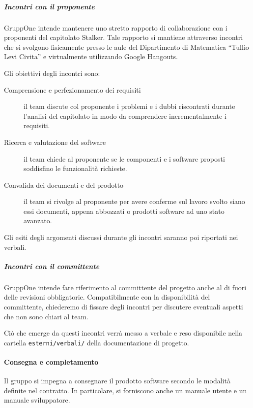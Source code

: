 \documentclass[../../norme-di-progetto.tex]{subfiles}
\begin{document}
\subparagraph{Incontri con il proponente}%
\label{subp:incontri_con_il_proponente}

GruppOne intende mantenere uno stretto rapporto di collaborazione con i proponenti del capitolato Stalker.
Tale rapporto si mantiene attraverso incontri che si svolgono fisicamente presso le aule del Dipartimento di Matematica ``Tullio Levi Civita'' e virtualmente utilizzando Google Hangouts.

Gli obiettivi degli incontri sono:
\begin{description}
  \item [Comprensione e perfezionamento dei requisiti] il team discute col proponente i problemi e i dubbi riscontrati durante l'analisi del capitolato in modo da comprendere incrementalmente i requisiti.
  \item [Ricerca e valutazione del software] il team chiede al proponente se le componenti e i software proposti soddisfino le funzionalità richieste.
  \item [Convalida dei documenti e del prodotto] il team si rivolge al proponente per avere conferme sul lavoro svolto siano essi documenti,  appena abbozzati o prodotti software ad uno stato avanzato.
\end{description}
Gli esiti degli argomenti discussi durante gli incontri saranno poi riportati nei verbali.

\subparagraph{Incontri con il committente}%
\label{subp:incontri_con_il_committente}

GruppOne intende fare riferimento al committente del progetto anche al di fuori delle revisioni obbligatorie.
Compatibilmente con la disponibilità del committente, chiederemo di fissare degli incontri per discutere eventuali aspetti che non sono chiari al team.

Ciò che emerge da questi incontri verrà messo a verbale e reso disponibile nella cartella \verb|esterni/verbali/| della documentazione di progetto.

\paragraph{Consegna e completamento}%
\label{par:consegna e completamento}

Il gruppo si impegna a consegnare il prodotto software secondo le modalità definite nel contratto. In particolare, si forniscono anche un manuale utente e un manuale sviluppatore.


\end{document}
